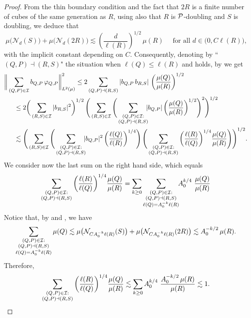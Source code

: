 \begin{proof}
From the thin boundary condition  and the fact that $2R$ is a finite number of
 cubes of the same generation as $R$, using also that $R$ is ${\mathcal P}$-doubling and $S$ is doubling, we deduce that
\begin{equation}\label{eqdd23}
\mu\big(\mathcal N_d(S)\big) + \mu\big(\mathcal N_d(2R)\big) \lesssim \left(\frac d{\ell(R)}\right)^{1/2}\,\mu(R)
\quad \mbox{ for all $d\in (0,C\ell(R)$),}
\end{equation}
with the implicit constant depending on $C$.
Consequently, denoting by ``$(Q,P) \dashv (R,S)$" the situation when $\ell(Q)\leq \ell(R)$ and  holds, by  we get
\begin{align*}
\bigg\|&\sum_{(Q,P)\in {\mathcal I}} b_{Q,P}\,{\varphi}_{Q,P}\bigg\|_{L^2(\mu)}^2  \le 2
\sum_{(Q,P)\dashv(R,S)} |b_{Q,P}\, b_{R,S}| \,\, \bigg(\frac{\mu(Q)}{\mu(R)}\bigg)^{1/2}\\
&\quad\leq 2\bigg(\sum_{(R,S)\in {\mathcal I}} |b_{R,S}|^2\bigg)^{1/2}\, \Bigg(\sum_{(R,S)\in {\mathcal I}} 
\Bigg(\sum_{\substack{(Q,P)\in {\mathcal I}:\\ (Q,P)\dashv(R,S)}}\!\!\! |b_{Q,P}| \, \bigg(\frac{\mu(Q)}{\mu(R)}\bigg)^{1/2}\Bigg)^2\Bigg)^{1/2}\\
&\quad \lesssim \Bigg( \sum_{(R,S)\in{\mathcal I}} \Bigg(
\sum_{\substack{(Q,P)\in {\mathcal I}:\\ (Q,P)\dashv(R,S)}}\!\!\! |b_{Q,P}|^2 \,\bigg(\frac{\ell(Q)}{\ell(R)}\bigg)^{1/4}\Bigg)
 \,
\Bigg( \sum_{\substack{(Q,P)\in {\mathcal I}:\\ (Q,P)\dashv(R,S)}} \bigg(\frac{\ell(R)}{\ell(Q)}\bigg)^{1/4}
\frac{\mu(Q)}{\mu(R)}\Bigg)\Bigg)^{1/2}.
\end{align*}
We consider now the last sum on the right hand side, which equals
\begin{align*}
\sum_{\substack{(Q,P)\in {\mathcal I}:\\ (Q,P)\dashv(R,S)}} \bigg(\frac{\ell(R)}{\ell(Q)}\bigg)^{1/4}
\frac{\mu(Q)}{\mu(R)} = \sum_{k\geq 0}
\sum_{\substack{(Q,P)\in {\mathcal I}:\\ (Q,P)\dashv(R,S)\\
\ell(Q)=A_0^{-k}\ell(R)}}\!\! A_0^{k/4}\,\,
\frac{\mu(Q)}{\mu(R)} 
\end{align*}
Notice that, by  and ,  we have
$$\sum_{\substack{(Q,P)\in {\mathcal I}:\\ (Q,P)\dashv(R,S)\\
\ell(Q)=A_0^{-k}\ell(R)}}\mu(Q) \lesssim 
\mu\big(\mathcal N_{CA_0^{-k}\ell(R)}(S)\big) + \mu\big(\mathcal N_{CA_0^{-k}\ell(R)}(2R)\big)\lesssim A_0^{-k/2}\,\mu(R).
$$
Therefore,
$$\sum_{\substack{(Q,P)\in {\mathcal I}:\\ (Q,P)\dashv(R,S)}} \bigg(\frac{\ell(R)}{\ell(Q)}\bigg)^{1/4}
\frac{\mu(Q)}{\mu(R)}\lesssim
\sum_{k\geq 0} A_0^{k/4}\,\,
\frac{A_0^{-k/2}\,\mu(R)}{\mu(R)} \lesssim 1.$$


\end{proof}

